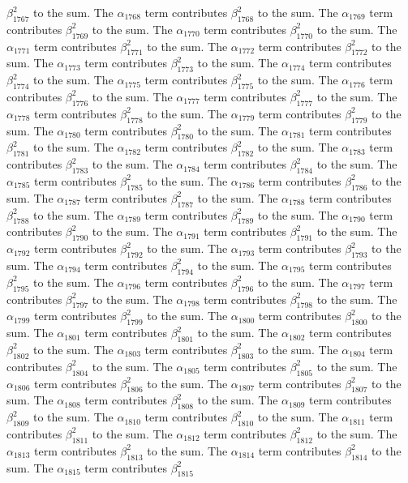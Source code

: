 \begin{lemma}
$\beta_{1767}^{2}$ to the sum. The $\alpha_{1768}$ term contributes $\beta_{1768}^{2}$ to the sum. The $\alpha_{1769}$ term contributes $\beta_{1769}^{2}$ to the sum. The $\alpha_{1770}$ term contributes $\beta_{1770}^{2}$ to the sum. The $\alpha_{1771}$ term contributes $\beta_{1771}^{2}$ to the sum. The $\alpha_{1772}$ term contributes $\beta_{1772}^{2}$ to the sum. The $\alpha_{1773}$ term contributes $\beta_{1773}^{2}$ to the sum. The $\alpha_{1774}$ term contributes $\beta_{1774}^{2}$ to the sum. The $\alpha_{1775}$ term contributes $\beta_{1775}^{2}$ to the sum. The $\alpha_{1776}$ term contributes $\beta_{1776}^{2}$ to the sum. The $\alpha_{1777}$ term contributes $\beta_{1777}^{2}$ to the sum. The $\alpha_{1778}$ term contributes $\beta_{1778}^{2}$ to the sum. The $\alpha_{1779}$ term contributes $\beta_{1779}^{2}$ to the sum. The $\alpha_{1780}$ term contributes $\beta_{1780}^{2}$ to the sum. The $\alpha_{1781}$ term contributes $\beta_{1781}^{2}$ to the sum. The $\alpha_{1782}$ term contributes $\beta_{1782}^{2}$ to the sum. The $\alpha_{1783}$ term contributes $\beta_{1783}^{2}$ to the sum. The $\alpha_{1784}$ term contributes $\beta_{1784}^{2}$ to the sum. The $\alpha_{1785}$ term contributes $\beta_{1785}^{2}$ to the sum. The $\alpha_{1786}$ term contributes $\beta_{1786}^{2}$ to the sum. The $\alpha_{1787}$ term contributes $\beta_{1787}^{2}$ to the sum. The $\alpha_{1788}$ term contributes $\beta_{1788}^{2}$ to the sum. The $\alpha_{1789}$ term contributes $\beta_{1789}^{2}$ to the sum. The $\alpha_{1790}$ term contributes $\beta_{1790}^{2}$ to the sum. The $\alpha_{1791}$ term contributes $\beta_{1791}^{2}$ to the sum. The $\alpha_{1792}$ term contributes $\beta_{1792}^{2}$ to the sum. The $\alpha_{1793}$ term contributes $\beta_{1793}^{2}$ to the sum. The $\alpha_{1794}$ term contributes $\beta_{1794}^{2}$ to the sum. The $\alpha_{1795}$ term contributes $\beta_{1795}^{2}$ to the sum. The $\alpha_{1796}$ term contributes $\beta_{1796}^{2}$ to the sum. The $\alpha_{1797}$ term contributes $\beta_{1797}^{2}$ to the sum. The $\alpha_{1798}$ term contributes $\beta_{1798}^{2}$ to the sum. The $\alpha_{1799}$ term contributes $\beta_{1799}^{2}$ to the sum. The $\alpha_{1800}$ term contributes $\beta_{1800}^{2}$ to the sum. The $\alpha_{1801}$ term contributes $\beta_{1801}^{2}$ to the sum. The $\alpha_{1802}$ term contributes $\beta_{1802}^{2}$ to the sum. The $\alpha_{1803}$ term contributes $\beta_{1803}^{2}$ to the sum. The $\alpha_{1804}$ term contributes $\beta_{1804}^{2}$ to the sum. The $\alpha_{1805}$ term contributes $\beta_{1805}^{2}$ to the sum. The $\alpha_{1806}$ term contributes $\beta_{1806}^{2}$ to the sum. The $\alpha_{1807}$ term contributes $\beta_{1807}^{2}$ to the sum. The $\alpha_{1808}$ term contributes $\beta_{1808}^{2}$ to the sum. The $\alpha_{1809}$ term contributes $\beta_{1809}^{2}$ to the sum. The $\alpha_{1810}$ term contributes $\beta_{1810}^{2}$ to the sum. The $\alpha_{1811}$ term contributes $\beta_{1811}^{2}$ to the sum. The $\alpha_{1812}$ term contributes $\beta_{1812}^{2}$ to the sum. The $\alpha_{1813}$ term contributes $\beta_{1813}^{2}$ to the sum. The $\alpha_{1814}$ term contributes $\beta_{1814}^{2}$ to the sum. The $\alpha_{1815}$ term contributes $\beta_{1815}^{2}$ 
\end{lemma}
